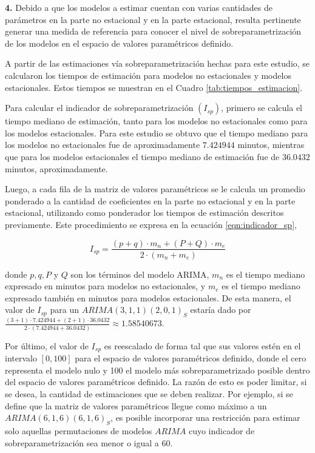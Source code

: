 \documentclass[
]{article}
\begin{document}
\textbf{4.} Debido a que los modelos a estimar cuentan con varias
cantidades de parámetros en la parte no estacional y en la parte
estacional, resulta pertinente generar una medida de referencia para
conocer el nivel de sobreparametrización de los modelos en el espacio de
valores paramétricos definido.

A partir de las estimaciones vía sobreparametrización hechas para este
estudio, se calcularon los tiempos de estimación para modelos no
estacionales y modelos estacionales. Estos tiempos se muestran en el
Cuadro \ref{tab:tiempos_estimacion}.

Para calcular el indicador de sobreparametrización \((I_{sp})\), primero
se calcula el tiempo mediano de estimación, tanto para los modelos no
estacionales como para los modelos estacionales. Para este estudio se
obtuvo que el tiempo mediano para los modelos no estacionales fue de
aproximadamente \(7.424944\) minutos, mientras que para los modelos
estacionales el tiempo mediano de estimación fue de \(36.0432\) minutos,
aproximadamente.

Luego, a cada fila de la matriz de valores paramétricos se le calcula un
promedio ponderado a la cantidad de coeficientes en la parte no
estacional y en la parte estacional, utilizando como ponderador los
tiempos de estimación descritos previamente. Este procedimiento se
expresa en la ecuación \eqref{eqn:indicador_sp},

\begin{equation}
\label{eqn:indicador_sp}
I_{sp} = \frac{(p+q) \cdot m_n + (P+Q) \cdot m_e}{2\cdot(m_n+m_e)}
\end{equation}

donde \(p,q,P\) y \(Q\) son los términos del modelo ARIMA, \(m_n\) es el
tiempo mediano expresado en minutos para modelos no estacionales, y
\(m_e\) es el tiempo mediano expresado también en minutos para modelos
estacionales. De esta manera, el valor de \(I_{sp}\) para un
\(ARIMA(3,1,1)(2,0,1)_S\) estaría dado por
\(\frac{(3+1) \cdot 7.424944 + (2+1) \cdot 36.0432}{2\cdot(7.424944+36.0432)} \approx 1.58540673\).

Por último, el valor de \(I_{sp}\) es reescalado de forma tal que sus
valores estén en el intervalo \([0,100]\) para el espacio de valores
paramétricos definido, donde el cero representa el modelo nulo y 100 el
modelo más sobreparametrizado posible dentro del espacio de valores
paramétricos definido. La razón de esto es poder limitar, si se desea,
la cantidad de estimaciones que se deben realizar. Por ejemplo, si se
define que la matriz de valores paramétricos llegue como máximo a un
\(ARIMA(6,1,6)(6,1,6)_S\), es posible incorporar una restricción para
estimar solo aquellas permutaciones de modelos \(ARIMA\) cuyo indicador
de sobreparametrización sea menor o igual a 60.
\end{document}
